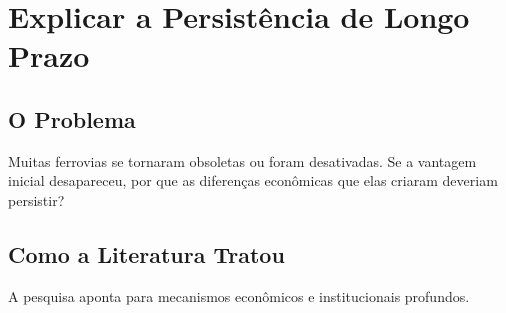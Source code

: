 \documentclass[12pt, a4paper]{article}
\begin{document}
\section{Explicar a Persistência de Longo Prazo}

\subsection{O Problema}

Muitas ferrovias se tornaram obsoletas ou foram desativadas. Se a vantagem inicial desapareceu, por que as diferenças econômicas que elas criaram deveriam persistir?

\subsection{Como a Literatura Tratou}

A pesquisa aponta para mecanismos econômicos e institucionais profundos.
\end{document}
